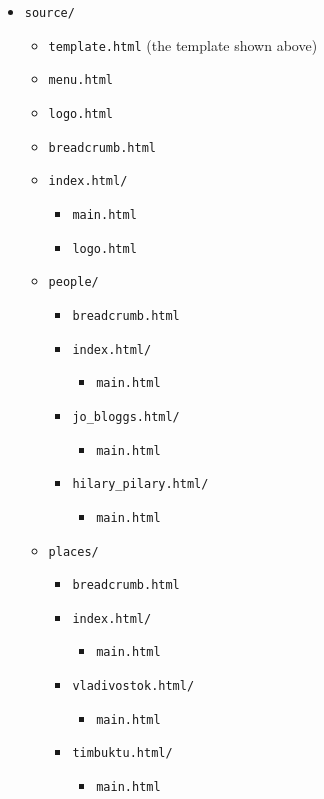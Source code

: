 \documentclass[a4paper,english]{scrartcl}
\begin{document}
\begin{itemize}
\item \verb|source/|
  \begin{itemize}
  \item \verb|template.html| (the template shown above)
  \item \verb|menu.html|
  \item \verb|logo.html|
  \item \verb|breadcrumb.html|
  \item \verb|index.html/|
    \begin{itemize}
    \item \verb|main.html|
    \item \verb|logo.html|
    \end{itemize}
  \item \verb|people/|
    \begin{itemize}
    \item \verb|breadcrumb.html|
    \item \verb|index.html/|
      \begin{itemize}
      \item \verb|main.html|
      \end{itemize}
    \item \verb|jo_bloggs.html/|
      \begin{itemize}
      \item \verb|main.html|
      \end{itemize}
    \item \verb|hilary_pilary.html/|
      \begin{itemize}
      \item \verb|main.html|
      \end{itemize}
    \end{itemize}
  \item \verb|places/|
    \begin{itemize}
    \item \verb|breadcrumb.html|
    \item \verb|index.html/|
      \begin{itemize}
      \item \verb|main.html|
      \end{itemize}
    \item \verb|vladivostok.html/|
      \begin{itemize}
      \item \verb|main.html|
      \end{itemize}
    \item \verb|timbuktu.html/|
      \begin{itemize}
      \item \verb|main.html|
      \end{itemize}
    \end{itemize}
  \end{itemize}
\end{itemize}
\end{document}
